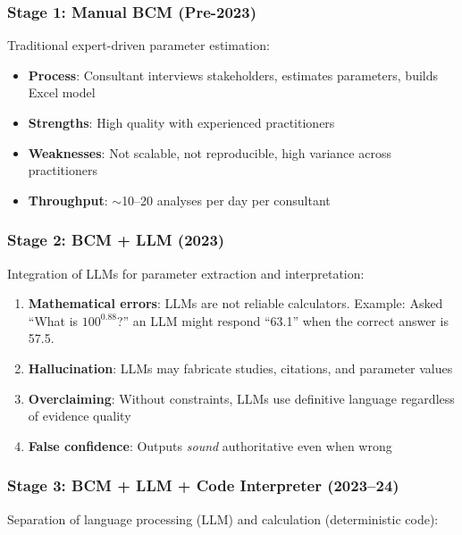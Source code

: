 \documentclass[11pt,a4paper]{article}
\begin{document}
\subsubsection{Stage 1: Manual BCM (Pre-2023)}

Traditional expert-driven parameter estimation:
\begin{itemize}
    \item \textbf{Process}: Consultant interviews stakeholders, estimates parameters, builds Excel model
    \item \textbf{Strengths}: High quality with experienced practitioners
    \item \textbf{Weaknesses}: Not scalable, not reproducible, high variance across practitioners
    \item \textbf{Throughput}: $\sim$10--20 analyses per day per consultant
\end{itemize}

\subsubsection{Stage 2: BCM + LLM (2023)}

Integration of LLMs for parameter extraction and interpretation:

\begin{warningbox}[title={Critical Risks of Stage 2}]
\begin{enumerate}
    \item \textbf{Mathematical errors}: LLMs are not reliable calculators. Example: Asked ``What is $100^{0.88}$?'' an LLM might respond ``63.1'' when the correct answer is 57.5.
    \item \textbf{Hallucination}: LLMs may fabricate studies, citations, and parameter values
    \item \textbf{Overclaiming}: Without constraints, LLMs use definitive language regardless of evidence quality
    \item \textbf{False confidence}: Outputs \textit{sound} authoritative even when wrong
\end{enumerate}
\end{warningbox}

\subsubsection{Stage 3: BCM + LLM + Code Interpreter (2023--24)}

Separation of language processing (LLM) and calculation (deterministic code):
\end{document}
